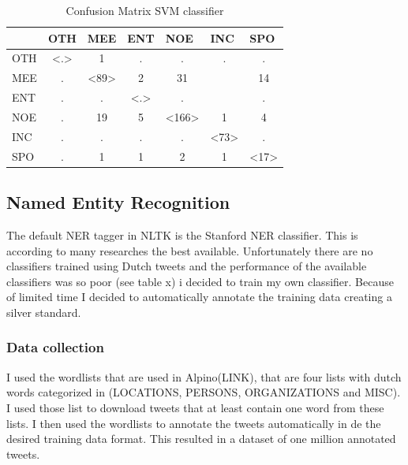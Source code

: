 \documentclass[
10pt, %
a4paper, %
oneside, %
headinclude,footinclude, %
BCOR5mm, %
]{scrartcl}
\begin{document}
\begin{table}[h]
\caption[Confusion Matrix SVM classifier]{Confusion Matrix SVM classifier }
\begin{tabular}{|l|c|c|c|c|c|c|}
\hline
    & \multicolumn{1}{l|}{OTH} & \multicolumn{1}{l|}{MEE} & \multicolumn{1}{l|}{ENT} & \multicolumn{1}{l|}{NOE} & \multicolumn{1}{l|}{INC} & \multicolumn{1}{l|}{SPO} \\ \hline
OTH & \textless.\textgreater   & 1                        & .                        & .                        & .                        & .                        \\ \hline
MEE & .                        & \textless89\textgreater  & 2                        & 31                       &                          & 14                       \\ \hline
ENT & .                        & .                        & \textless.\textgreater   & .                        &                          & .                        \\ \hline
NOE & .                        & 19                       & 5                        & \textless166\textgreater & 1                        & 4                        \\ \hline
INC & .                        & .                        & .                        & .                        & \textless73\textgreater  & .                        \\ \hline
SPO & .                        & 1                        & 1                        & 2                        & 1                        & \textless17\textgreater  \\ \hline
\end{tabular}

\end{table}

\subsection{Named Entity Recognition}
The default NER tagger in NLTK is the Stanford NER classifier. This is according to many researches the best available. Unfortunately there are no classifiers trained using Dutch tweets and the performance of the available classifiers was so poor (see table x) i decided to train my own classifier. Because of limited time I decided to automatically annotate the training data creating a silver standard.

\subsubsection{Data collection}
I used the wordlists that are used in Alpino(LINK), that are four lists with dutch words categorized in (LOCATIONS, PERSONS, ORGANIZATIONS and MISC). I used those list to download tweets that at least contain one word from these lists. I then used the wordlists to annotate the tweets automatically in de the desired training data format. This resulted in a dataset of one million annotated tweets. 
\end{document}
